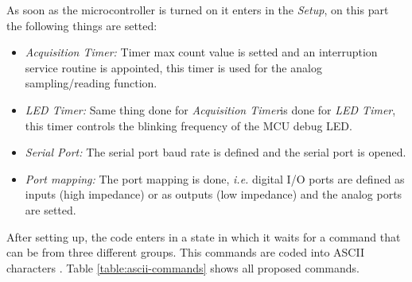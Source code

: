 	
	As soon as the microcontroller is turned on it enters in the \textit{Setup}, on this part the following things are setted:
	\begin{itemize}
		\item \textit{Acquisition Timer:} Timer max count value is setted and an interruption service routine is appointed, this timer is used for the analog sampling/reading function.\label{itm:mcu-prog-timer1}
		\item \textit{LED Timer:} Same thing done for \textit{Acquisition Timer}is done for \textit{LED Timer}, this timer controls the blinking frequency of the MCU debug LED.\label{itm:mcu-prog-timer2}
		\item \textit{Serial Port: } The serial port baud rate is defined and the serial port is opened.\label{itm:mcu-prog-serial-port}
		\item \textit{Port mapping: } The port mapping is done, \textit{i.e.} digital I/O ports are defined as inputs (high impedance) or as outputs (low impedance) and the analog ports are setted.\label{itm:mcu-prog-port}
	\end{itemize}
	
	After setting up, the code enters in a state in which it waits for a command that can be from three different groups. This commands are coded into ASCII characters \cite{ascii}. Table \ref{table:ascii-commands} shows all proposed commands.

